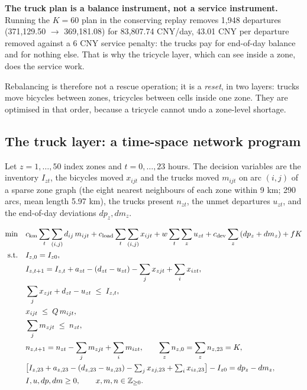 \textbf{The truck plan is a balance instrument, not a service instrument.} Running the
$K=60$ plan in the conserving replay removes 1,948 departures (371,129.50 $\to$
369,181.08) for 83,807.74 CNY/day, 43.01 CNY per departure removed against a 6 CNY
service penalty: the trucks pay for end-of-day balance and for nothing else. That is
why the tricycle layer, which can see inside a zone, does the service work.

Rebalancing is therefore not a rescue operation; it is a \emph{reset}, in two layers:
trucks move bicycles between zones, tricycles between cells inside one zone. They are
optimised in that order, because a tricycle cannot undo a zone-level shortage.

\subsection{The truck layer: a time-space network program}

Let $z=1,\dots,50$ index zones and $t=0,\dots,23$ hours. The decision variables are
the inventory $I_{zt}$, the bicycles moved $x_{ijt}$ and the trucks moved $m_{ijt}$ on
arc $(i,j)$ of a sparse zone graph (the eight nearest neighbours of each zone within
9 km; 290 arcs, mean length 5.97 km), the trucks present $n_{zt}$, the unmet
departures $u_{zt}$, and the end-of-day deviations $dp_z,dm_z$.

{\allowdisplaybreaks
\begin{align}
\min\quad
& c_{\text{km}}\sum_{t}\sum_{(i,j)} d_{ij}\,m_{ijt}
+ c_{\text{load}}\sum_t\sum_{(i,j)} x_{ijt}
+ w\sum_t\sum_z u_{zt}
+ c_{\text{dev}}\sum_z\left(dp_z+dm_z\right)
+ f K \label{eq:q2obj}\\
\text{s.t.}\quad
& I_{z,0} = I_{z0}, \label{eq:q2init}\\
& I_{z,t+1} = I_{z,t} + a_{zt} - \left(d_{zt}-u_{zt}\right)
  - \sum_{j} x_{zjt} + \sum_{i} x_{izt}, \label{eq:q2bal}\\
& \sum_j x_{zjt} + d_{zt} - u_{zt} \;\le\; I_{z,t}, \label{eq:q2serv}\\
& x_{ijt} \;\le\; Q\,m_{ijt}, \label{eq:q2cap}\\
& \sum_{j} m_{zjt} \;\le\; n_{zt}, \label{eq:q2truck}\\
& n_{z,t+1} = n_{zt} - \sum_j m_{zjt} + \sum_i m_{izt},
  \qquad \sum_z n_{z,0} = \sum_z n_{z,23} = K, \label{eq:q2fleet}\\
& \big[I_{z,23} + a_{z,23} - (d_{z,23}-u_{z,23})
   - \textstyle\sum_j x_{zj,23} + \sum_i x_{iz,23}\big] - I_{z0} = dp_z - dm_z,
  \label{eq:q2dev}\\
& I,u,dp,dm \ge 0,\qquad x,m,n \in \mathbb{Z}_{\ge 0}. \notag
\end{align}}

